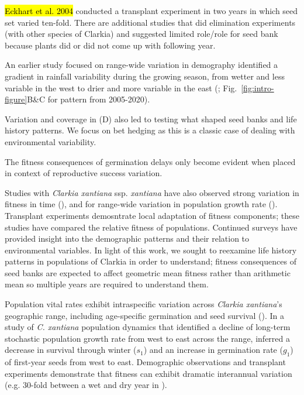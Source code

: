 \documentclass[12pt, oneside, titlepage]{article}   	%
\begin{document}
{\iffalse
\hl{Eckhart et al. 2004} conducted a transplant experiment in two years in which seed set varied ten-fold. There are additional studies that did elimination experiments (with other species of Clarkia) and suggested limited role/role for seed bank because plants did or did not come up with following year. 

An earlier study focused on range-wide variation in demography identified a gradient in rainfall variability during the growing season, from wetter and less variable in the west to drier and more variable in the east (\cite{eckhart2011}; Fig.~\ref{fig:intro-figure}B\&C for pattern from 2005-2020). 

Variation and coverage in (D) also led to testing what shaped seed banks and life history patterns. We focus on bet hedging as this is a classic case of dealing with environmental variability. 

The fitness consequences of germination delays only become evident when placed in context of reproductive success variation. 

Studies with \textit{Clarkia xantiana} ssp. \textit{xantiana} have also observed strong variation in fitness in time (\cite{geber2005}), and for range-wide variation in population growth rate (\cite{eckhart2011}). Transplant experiments demosntrate local adaptation of fitness components; these studies have compared the relative fitness of populations. Continued surveys have provided insight into the demographic patterns and their relation to environmental variables. In light of this work, we sought to reexamine life history patterns in populations of Clarkia in order to understand; fitness consequences of seed banks are expected to affect geometric mean fitness rather than arithmetic mean so multiple years are required to understand them.

Population vital rates exhibit intraspecific variation across \textit{Clarkia xantiana}'s geographic range, including age-specific germination and seed survival (\cite{eckhart2011}). In a study of \textit{C. xantiana} population dynamics that identified a decline of long-term stochastic population growth rate from west to east across the range, \cite{eckhart2011} inferred a decrease in survival through winter ($s_1$) and an increase in germination rate ($g_1$) of first-year seeds from west to east. Demographic observations \cite{eckhart2011} and transplant experiments demonstrate that fitness can exhibit dramatic interannual variation (e.g. 30-fold between a wet and dry year in \cite{geber2005}). 

}
\end{document}
